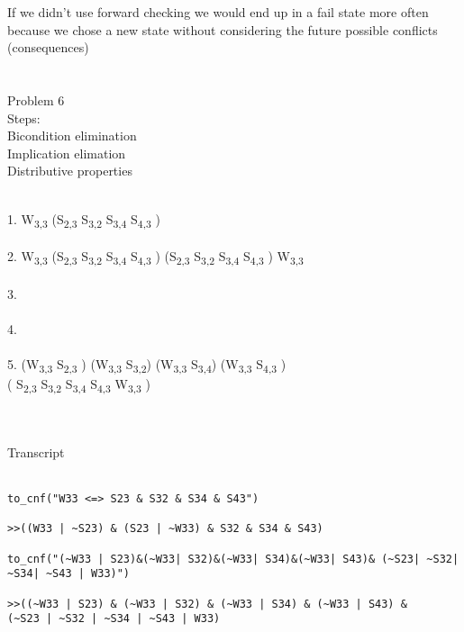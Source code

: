 \documentclass{article}
\let\biconditional\leftrightarrow
\begin{document}
If we didn't use forward checking we would end up in a fail state more often because we
chose a new state without considering the future possible conflicts (consequences)
\\
\\
\\
Problem 6 \\
Steps: \\
Bicondition elimination \\
Implication elimation \\
Distributive properties \\
\\
\begin{p6}
1. W\textsubscript{3,3} \biconditional \big(S\textsubscript{2,3} \land S\textsubscript{3,2} \land S\textsubscript{3,4} \land S\textsubscript{4,3} \big)\\
\\
2. W\textsubscript{3,3} \to \big(S\textsubscript{2,3} \land S\textsubscript{3,2} \land S\textsubscript{3,4} \land S\textsubscript{4,3} ) \land (S\textsubscript{2,3} \land S\textsubscript{3,2} \land S\textsubscript{3,4} \land S\textsubscript{4,3} \big) \to W\textsubscript{3,3} \\
\\
3.  \land {} \\
\\
4.  \land {} \\
\\
5. \big(\neg W\textsubscript{3,3} \lor S\textsubscript{2,3} \big) \land \big(\neg W\textsubscript{3,3} \lor S\textsubscript{3,2}\big) \land \big(\neg W\textsubscript{3,3} \lor S\textsubscript{3,4}\big) \land  \big(\neg W\textsubscript{3,3} \lor S\textsubscript{4,3} \big) \\ \land( \neg S\textsubscript{2,3} \lor \neg S\textsubscript{3,2} \lor \neg S\textsubscript{3,4} \lor \neg S\textsubscript{4,3} \lor W\textsubscript{3,3} \big) \\
\end{p6}
\\
\\
Transcript \\
\\
\begin{verbatim}
to_cnf("W33 <=> S23 & S32 & S34 & S43")

>>((W33 | ~S23) & (S23 | ~W33) & S32 & S34 & S43)

to_cnf("(~W33 | S23)&(~W33| S32)&(~W33| S34)&(~W33| S43)& (~S23| ~S32| ~S34| ~S43 | W33)")

>>((~W33 | S23) & (~W33 | S32) & (~W33 | S34) & (~W33 | S43) & 
(~S23 | ~S32 | ~S34 | ~S43 | W33)
\end{verbatim}
\end{document}
